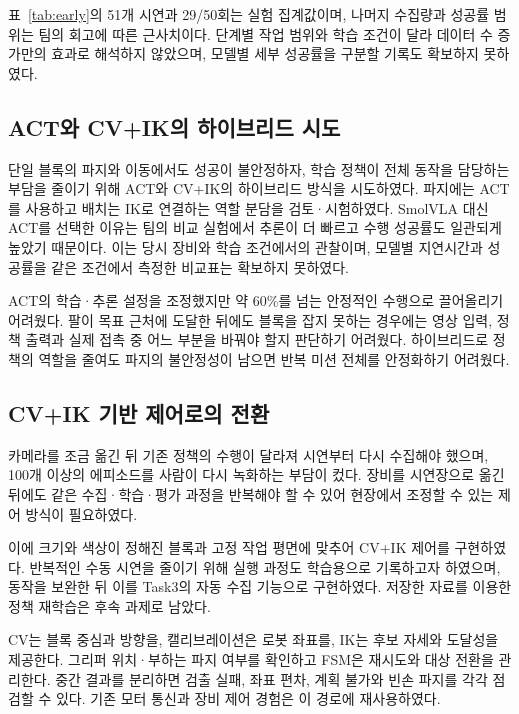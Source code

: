 표~\ref{tab:early}의 51개 시연과 29/50회는 실험 집계값이며, 나머지 수집량과 성공률 범위는 팀의 회고에 따른 근사치이다. 단계별 작업 범위와 학습 조건이 달라 데이터 수 증가만의 효과로 해석하지 않았으며, 모델별 세부 성공률을 구분할 기록도 확보하지 못하였다.

\subsection{ACT와 CV+IK의 하이브리드 시도}
단일 블록의 파지와 이동에서도 성공이 불안정하자, 학습 정책이 전체 동작을 담당하는 부담을 줄이기 위해 ACT와 CV+IK의 하이브리드 방식을 시도하였다. 파지에는 ACT를 사용하고 배치는 IK로 연결하는 역할 분담을 검토·시험하였다. SmolVLA 대신 ACT를 선택한 이유는 팀의 비교 실험에서 추론이 더 빠르고 수행 성공률도 일관되게 높았기 때문이다. 이는 당시 장비와 학습 조건에서의 관찰이며, 모델별 지연시간과 성공률을 같은 조건에서 측정한 비교표는 확보하지 못하였다.

ACT의 학습·추론 설정을 조정했지만 약 60\%를 넘는 안정적인 수행으로 끌어올리기 어려웠다. 팔이 목표 근처에 도달한 뒤에도 블록을 잡지 못하는 경우에는 영상 입력, 정책 출력과 실제 접촉 중 어느 부분을 바꿔야 할지 판단하기 어려웠다. 하이브리드로 정책의 역할을 줄여도 파지의 불안정성이 남으면 반복 미션 전체를 안정화하기 어려웠다.

\subsection{CV+IK 기반 제어로의 전환}
카메라를 조금 옮긴 뒤 기존 정책의 수행이 달라져 시연부터 다시 수집해야 했으며, 100개 이상의 에피소드를 사람이 다시 녹화하는 부담이 컸다. 장비를 시연장으로 옮긴 뒤에도 같은 수집·학습·평가 과정을 반복해야 할 수 있어 현장에서 조정할 수 있는 제어 방식이 필요하였다.

이에 크기와 색상이 정해진 블록과 고정 작업 평면에 맞추어 CV+IK 제어를 구현하였다. 반복적인 수동 시연을 줄이기 위해 실행 과정도 학습용으로 기록하고자 하였으며, 동작을 보완한 뒤 이를 Task3의 자동 수집 기능으로 구현하였다. 저장한 자료를 이용한 정책 재학습은 후속 과제로 남았다.

CV는 블록 중심과 방향을, 캘리브레이션은 로봇 좌표를, IK는 후보 자세와 도달성을 제공한다. 그리퍼 위치·부하는 파지 여부를 확인하고 FSM은 재시도와 대상 전환을 관리한다. 중간 결과를 분리하면 검출 실패, 좌표 편차, 계획 불가와 빈손 파지를 각각 점검할 수 있다. 기존 모터 통신과 장비 제어 경험은 이 경로에 재사용하였다.

